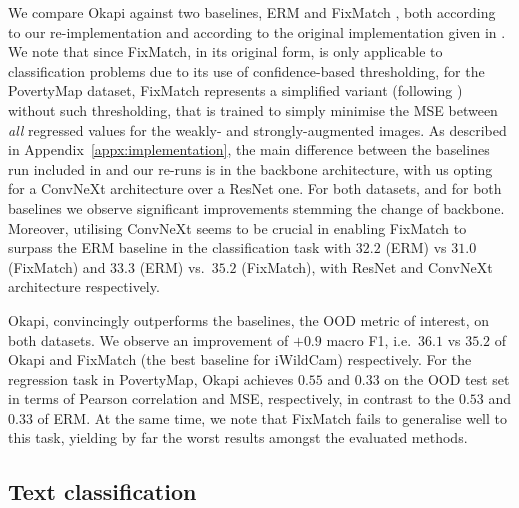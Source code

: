 We compare Okapi against two baselines, \ac{ERM} and FixMatch \citep{sohn2020fixmatch},
both according to our re-implementation and according to the original implementation given in
\citet{SagWeiLeeGaoetal22}.
%
We note that since FixMatch, in its original form, is only applicable to classification problems
due to its use of confidence-based thresholding, for the PovertyMap dataset, FixMatch represents a
simplified variant (following \citep{SagWeiLeeGaoetal22}) without such thresholding, that is
trained to simply minimise the MSE between \emph{all} regressed values for the weakly- and
strongly-augmented images.
%
As described in Appendix~\ref{appx:implementation}, the main difference between the baselines run
included in \citet{SagWeiLeeGaoetal22} and our re-runs is in the backbone architecture, with us
opting for a ConvNeXt \citep{liu2022convnet} architecture over a ResNet one.
%
For both datasets, and for both baselines we observe significant improvements stemming the change
of backbone.
%
%
Moreover, utilising ConvNeXt seems to be crucial in enabling FixMatch to surpass the \ac{ERM}
baseline in the classification task with $32.2$ (ERM) vs $31.0$ (FixMatch) and $33.3$ (ERM) vs.\
$35.2$ (FixMatch), with ResNet and ConvNeXt architecture respectively. 
% 

Okapi, convincingly outperforms the baselines, \wrt{} the \ac{OOD} metric of interest, on both
datasets. 
%
We observe an improvement of $+0.9$ macro F1, i.e.\ $36.1$ vs $35.2$ of Okapi and FixMatch (the best
baseline for iWildCam) respectively. For the regression task in PovertyMap, Okapi achieves $0.55$
and $0.33$ on the \ac{OOD} test set in terms of Pearson correlation and MSE, respectively, in contrast
to the $0.53$ and $0.33$ of \ac{ERM}.
%
At the same time, we note that FixMatch fails to generalise well to this task, yielding by far the
worst results amongst the evaluated methods.

\subsection{Text classification}

